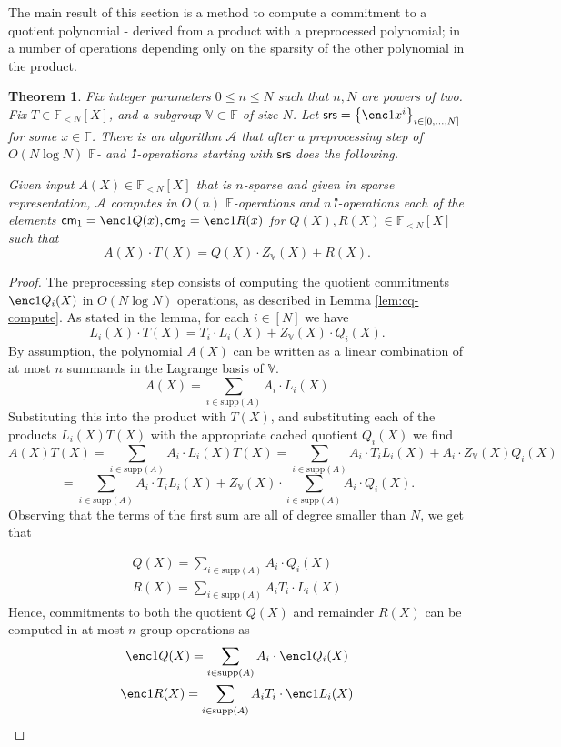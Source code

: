 \documentclass[11pt]{article} %
\newcommand{\alg}{\ensuremath{\mathscr{A}}\xspace}
\newcommand{\F}{\ensuremath{\mathbb F}\xspace}
\newcommand{\srs}{\ensuremath{\mathsf{srs}}\xspace}
\newcommand{\cm}{\ensuremath{\mathsf{cm}}\xspace}
\newcommand{\sett}[2]{\ensuremath{\set{#1}_{#2}}\xspace}
\newcommand{\set}[1]{\ensuremath{\left\{#1\right\}}\xspace}
\newcommand{\polysofdeg}[1]{\ensuremath{\F_{< #1}[X]}\xspace}
\newtheorem{thm}[lemma]{Theorem}
\newcommand{\bigspace}{\ensuremath{\mathbb{V}}\xspace}
\newcommand{\witsize}{\ensuremath{n}\xspace}
\newcommand{\tabsize}{\ensuremath{N}\xspace}
\newcommand{\tabruntime}{\ensuremath{\tabsize\log\tabsize}\xspace}
\newcommand{\supp}[1]{\ensuremath{\mathrm{supp}(#1)}\xspace}
\begin{document}
The main result of this section is a method to compute a commitment to a quotient polynomial - derived from a product with a preprocessed polynomial; in a number of operations depending only on the sparsity of the other polynomial in the product. 
\begin{thm}\label{thm:sec3main}
Fix integer parameters $0\leq n\leq N$ such that $n,N$ are powers of two. Fix $T\in \polysofdeg{\tabsize}$, and a subgroup $\bigspace\subset \F$ of size \tabsize. Let $\srs=\sett{\enc1{x^i}}{i\in[0,\ldots,\tabsize]}$ for some $x\in \F$. 
There is an algorithm \alg that after a preprocessing step of $O(\tabruntime)$ \F- and \G1-operations starting with \srs does the following.


Given input $A(X)\in \polysofdeg{\tabsize}$ that is \witsize-sparse and given in sparse representation, \alg computes in 
$O(\witsize)$ \F-operations and \witsize \G1-operations each of the elements
$\cm_1=\enc1{Q(x)},\cm_2=\enc1{R(x)}$ for $Q(X),R(X)\in \polysofdeg{\tabsize}$ such that
\[A(X)\cdot T(X) = Q(X)\cdot Z_{\bigspace}(X) + R(X).\]
\end{thm}
\begin{proof}
    The preprocessing step consists of computing the quotient commitments $\enc1{Q_i(X)}$ in $O(\tabruntime)$ operations, as described in Lemma \ref{lem:cq-compute}. As stated in the lemma,
    for each $i\in[\tabsize]$ we have
    \[L_i(X)\cdot T(X)=T_i\cdot L_i(X) + Z_\bigspace(X)\cdot Q_i(X).\]
    By assumption, the polynomial $A(X)$ can be written as a linear combination of
    at most $\witsize$ summands in the Lagrange basis of $\bigspace$.
    \[ A(X) = \sum_{i \in \supp{A}} A_i\cdot L_i(X) \]
    Substituting this into the product with $T(X)$, and substituting each of the products
    $L_i(X) T(X)$ with the appropriate cached quotient $Q_i(X)$ we find
    \[ A(X) T(X) = \sum_{i\in \supp{A}} A_i\cdot  L_i(X) T(X) =\sum_{i \in
    \supp{A}} A_i \cdot T_i L_i(X) + A_i\cdot Z_\bigspace(X) Q_i(X) \] 
   \[=\sum_{i \in  \supp{A}} A_i \cdot T_i L_i(X) +Z_\bigspace(X)\cdot \sum_{i \in
    \supp{A}} A_i \cdot Q_i(X).\] 
Observing that the terms of the first sum are all of degree smaller than \tabsize, we get that

    \begin{gather*}
Q(X)=\sum_{i \in  \supp{A}} A_i \cdot Q_i(X) \\
        R(X) = \sum_{i \in \supp{A}} A_i T_i \cdot L_i(X)
    \end{gather*}
    Hence, commitments to both the quotient $Q(X)$ and remainder $R(X)$ can be computed in
   at most \witsize group operations as 
    \begin{gather*}
        \enc1{Q(X)} = \sum_{i \in \supp{A}} A_i \cdot \enc1{Q_i(X)} \\
        \enc1{R(X)} = \sum_{i \in \supp{A}} A_i T_i \cdot \enc1{L_i(X)}
    \end{gather*}
\end{proof}
\end{document}
